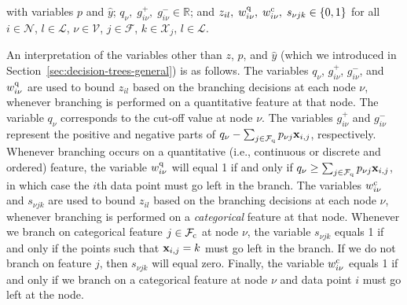 \documentclass[letterpaper]{article} %
\theoremstyle{definition}
\newcommand{\field}[1]{\ensuremath{\mathbb{#1}}}
\newcommand{\sets}[1]{\ensuremath{\mathcal{#1}}}
\newcommand{\reals}{\ensuremath{\field{R}}} %
\newcommand{\1}{\ensuremath{{\rm e}}} %
\begin{document}
\noindent with variables $p$ and $\hat y$; $q_{\nu}, \; g_{i\nu}^+, \; g_{i\nu}^-\in \reals$; and $z_{il}, \; w^{\rm q}_{i \nu}, \; w^{\rm c}_{i \nu}, \; s_{\nu j k}  \in  \{0,1\}$ for all $i \in \sets N$, $l \in {\sets L}$, $\nu \in \sets V$, $j \in \sets F$, $k\in \sets X_j$, $l \in \mathcal L$.

An interpretation of the variables other than $z$, $p$, and $\hat y$ (which we introduced in Section~\ref{sec:decision-trees-general}) is as follows. The variables $q_{\nu}$,  $g_{i\nu}^+$, $g_{i\nu}^-$, and $w^{\rm q}_{i \nu}$ are used to bound $z_{il}$ based on the branching decisions at each node $\nu$, whenever branching is performed on a quantitative feature at that node. The variable $q_\nu$ corresponds to the cut-off value at node $\nu$. The variables $g_{i\nu}^+$ and $g_{i\nu}^-$ represent the positive and negative parts of $q_\nu - \sum_{j \in \sets F_{{\rm q}}} p_{\nu j} {\bf x}_{i,j}$, respectively. Whenever branching occurs on a quantitative (i.e., continuous or discrete and ordered) feature, the variable $w_{i\nu}^{\rm q}$ will equal 1 if and only if $q_\nu \geq \sum_{j \in \sets F_{{\rm q}}} p_{\nu j} {\bf x}_{i,j}$, in which case the $i$th data point must go left in the branch. The variables $w^{\rm c}_{i \nu}$ and $s_{\nu j k}$ are used to bound $z_{il}$ based on the branching decisions at each node $\nu$, whenever branching is performed on a \emph{categorical} feature at that node. Whenever we branch on categorical feature $j \in \sets F_{\rm c}$ at node $\nu$, the variable $s_{\nu j k}$ equals 1 if and only if the points such that ${\bf x}_{i,j}=k$ must go left in the branch. If we do not branch on feature $j$, then $s_{\nu j k}$ will equal zero. Finally, the variable $w_{i\nu}^{\rm c}$ equals 1 if and only if we branch on a categorical feature at node $\nu$ and data point $i$ must go left at the node.
\end{document}
